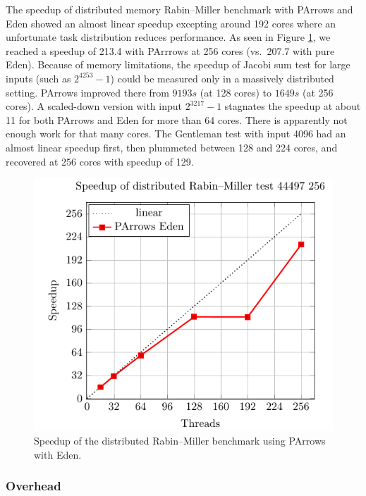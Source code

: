 \documentclass[paper=A4,twoside=true,openright,parskip=full,chapterprefix=true,headings=normal,bibliography=totoc,listof=totoc,titlepage=on,captions=tableabove,draft=false,british]{scrreprt}%
\begin{document}
The speedup of distributed memory Rabin--Miller benchmark with PArrows
and Eden showed an almost linear speedup excepting around 192 cores
where an unfortunate task distribution reduces performance. As seen in
Figure \ref{fig:rabinMillerDistSpeedup}, we reached a speedup of 213.4
with PArrrows at 256 cores (vs.~207.7 with pure Eden). Because of memory
limitations, the speedup of Jacobi sum test for large inputs (such as
\(2^{4253}-1\)) could be measured only in a massively distributed
setting. PArrows improved there from \(9193s\) (at 128 cores) to
\(1649s\) (at 256 cores). A scaled-down version with input
\(2^{3217}-1\) stagnates the speedup at about 11 for both PArrows and
Eden for more than 64 cores. There is apparently not enough work for
that many cores. The Gentleman test with input 4096 had an almost linear
speedup first, then plummeted between 128 and 224 cores, and recovered
at 256 cores with speedup of 129.

\begin{figure}
\centering
\includegraphics{src/img/rabinMillerDistSpeedup.pdf}
\caption{Speedup of the distributed Rabin--Miller benchmark using
PArrows with Eden.\label{fig:rabinMillerDistSpeedup}}
\end{figure}

\hypertarget{overhead-1}{%
\subsubsection{Overhead}\label{overhead-1}}
\end{document}
